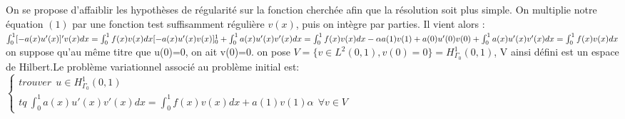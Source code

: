 \documentclass[a4paper,french,10pt]{article}
\begin{document}
On se propose d'affaiblir les hypothèses de régularité sur la fonction cherchée afin que la résolution soit plus simple. On multiplie notre équation $(1)$ par une fonction test suffisamment régulière $v(x)$, puis on intègre par parties. Il vient alors :
\newline\newline  $  \int_{0}^{1}[-a(x)u'(x)]'v(x)dx=\int_{0}^{1}f(x)v(x)dx
\newline\newline   [-a(x)u'(x)v(x)]_{0}^{1}+\int_{0}^{1}a(x)u'(x)v'(x)dx=\int_{0}^{1}f(x)v(x)dx  \newline\newline  -\alpha a(1)v(1)+a(0)u'(0)v(0)+\int_{0}^{1}a(x)u'(x)v'(x)dx=\int_{0}^{1}f(x)v(x)dx $
\newline\newline on suppose qu'au même titre que u(0)=0, on ait v(0)=0.
\newline\newline on pose $V=\{ v \in L^{2}(0,1), v(0)=0  \}=H_{\Gamma_{0}}^{1}(0,1) $, V ainsi défini est un espace de Hilbert.Le problème variationnel associé au problème initial est:
\newline\newline  $\left\{
\begin{array}{l}
  trouver~~u  \in H_{\Gamma_{0}}^{1}(0,1)   \\
  tq~\int_{0}^{1}a(x)u'(x)v'(x)dx=\int_{0}^{1}f(x)v(x)dx+a(1)v(1)\alpha~~\forall v\in V
\end{array}
\right.$
\end{document}
